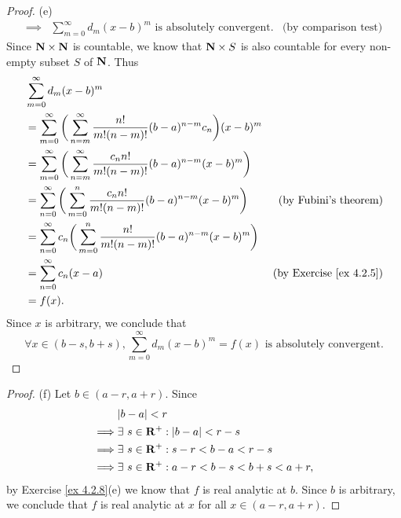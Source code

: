 \begin{proof}{(e)}
\begin{align*}
        \implies & \sum_{m = 0}^\infty d_m (x - b)^m \text{ is absolutely convergent}.                                                                                                        & \text{(by comparison test)}
    \end{align*}
    Since \(\mathbf{N} \times \mathbf{N}\) is countable, we know that \(\mathbf{N} \times S\) is also countable for every non-empty subset \(S\) of \(\mathbf{N}\).
    Thus
    \begin{align*}
         & \sum_{m = 0}^\infty d_m (x - b)^m                                                                                                                \\
         & = \sum_{m = 0}^\infty \bigg(\sum_{n = m}^\infty \frac{n!}{m! (n - m)!} (b - a)^{n - m} c_n\bigg) (x - b)^m                                       \\
         & = \sum_{m = 0}^\infty \bigg(\sum_{n = m}^\infty \frac{c_n n!}{m! (n - m)!} (b - a)^{n - m} (x - b)^m\bigg)                                       \\
         & = \sum_{n = 0}^\infty \bigg(\sum_{m = 0}^n \frac{c_n n!}{m! (n - m)!} (b - a)^{n - m} (x - b)^m\bigg)      & \text{(by Fubini's theorem)}        \\
         & = \sum_{n = 0}^\infty c_n \bigg(\sum_{m = 0}^n \frac{n!}{m! (n - m)!} (b - a)^{n - m} (x - b)^m\bigg)                                            \\
         & = \sum_{n = 0}^\infty c_n (x - a)                                                                          & \text{(by Exercise \ref{ex 4.2.5})} \\
         & = f(x).
    \end{align*}
    Since \(x\) is arbitrary, we conclude that
    \[
        \forall x \in (b - s, b + s), \sum_{m = 0}^\infty d_m (x - b)^m = f(x) \text{ is absolutely convergent}.
    \]
\end{proof}

\begin{proof}{(f)}
    Let \(b \in (a - r, a + r)\).
    Since
    \begin{align*}
                 & \abs{b - a} < r                                      \\
        \implies & \exists\ s \in \R^+ : \abs{b - a} < r - s            \\
        \implies & \exists\ s \in \R^+ : s - r < b - a < r - s          \\
        \implies & \exists\ s \in \R^+ : a - r < b - s < b + s < a + r,
    \end{align*}
    by Exercise \ref{ex 4.2.8}(e) we know that \(f\) is real analytic at \(b\).
    Since \(b\) is arbitrary, we conclude that \(f\) is real analytic at \(x\) for all \(x \in (a - r, a + r)\).
\end{proof}